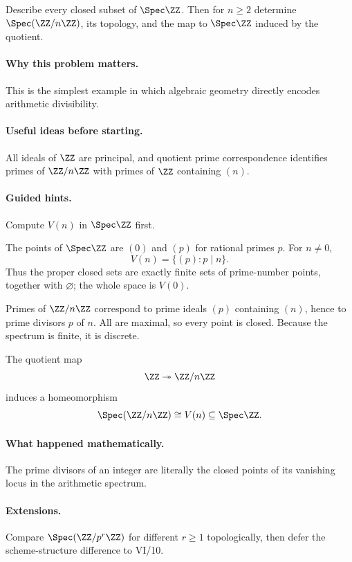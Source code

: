 \begin{problem}
Describe every closed subset of $\Spec\ZZ$.  Then for $n\ge2$ determine
$\Spec(\ZZ/n\ZZ)$, its topology, and the map to $\Spec\ZZ$ induced by the quotient.
\end{problem}

\paragraph{Why this problem matters.}
This is the simplest example in which algebraic geometry directly encodes arithmetic
divisibility.

\paragraph{Useful ideas before starting.}
All ideals of $\ZZ$ are principal, and quotient prime correspondence identifies primes of
$\ZZ/n\ZZ$ with primes of $\ZZ$ containing $(n)$.

\paragraph{Guided hints.}
Compute $V(n)$ in $\Spec\ZZ$ first.

\begin{solution}
The points of $\Spec\ZZ$ are $(0)$ and $(p)$ for rational primes $p$.  For $n\neq0$,
\[
V(n)=\{(p):p\mid n\}.
\]
Thus the proper closed sets are exactly finite sets of prime-number points, together with
$\varnothing$; the whole space is $V(0)$.

Primes of $\ZZ/n\ZZ$ correspond to prime ideals $(p)$ containing $(n)$, hence to prime
divisors $p$ of $n$.  All are maximal, so every point is closed.  Because the spectrum is
finite, it is discrete.

The quotient map
\[
\ZZ\twoheadrightarrow\ZZ/n\ZZ
\]
induces a homeomorphism
\[
\Spec(\ZZ/n\ZZ)\cong V(n)\subseteq\Spec\ZZ.
\]
\end{solution}

\paragraph{What happened mathematically.}
The prime divisors of an integer are literally the closed points of its vanishing locus in
the arithmetic spectrum.

\paragraph{Extensions.}
Compare $\Spec(\ZZ/p^r\ZZ)$ for different $r\ge1$ topologically, then defer the
scheme-structure difference to VI/10.
